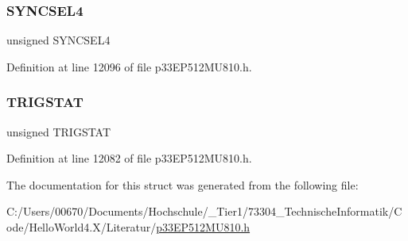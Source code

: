 \mbox{\label{structtag_o_c14_c_o_n2_b_i_t_s_a0cd5bbe196c7974953909d27a6307bb7}} 
\subsubsection{\texorpdfstring{S\+Y\+N\+C\+S\+E\+L4}{SYNCSEL4}}
{\footnotesize\ttfamily unsigned S\+Y\+N\+C\+S\+E\+L4}



Definition at line 12096 of file p33\+E\+P512\+M\+U810.\+h.

\mbox{\label{structtag_o_c14_c_o_n2_b_i_t_s_ab379549de54ac93ad4aa73686c34cb7c}} 
\subsubsection{\texorpdfstring{T\+R\+I\+G\+S\+T\+AT}{TRIGSTAT}}
{\footnotesize\ttfamily unsigned T\+R\+I\+G\+S\+T\+AT}



Definition at line 12082 of file p33\+E\+P512\+M\+U810.\+h.



The documentation for this struct was generated from the following file\+:\begin{DoxyCompactItemize}
\item 
C\+:/\+Users/00670/\+Documents/\+Hochschule/\+\_\+\+Tier1/73304\+\_\+\+Technische\+Informatik/\+Code/\+Hello\+World4.\+X/\+Literatur/\hyperlink{p33_e_p512_m_u810_8h}{p33\+E\+P512\+M\+U810.\+h}\end{DoxyCompactItemize}
